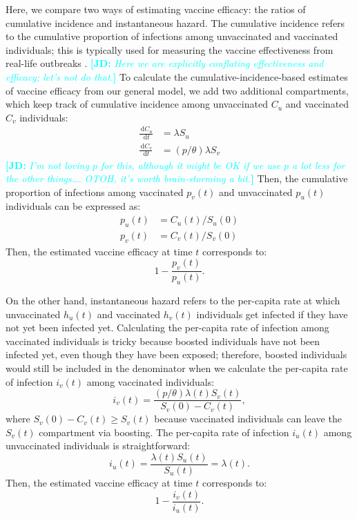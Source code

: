 \documentclass[12pt]{article}
\newcommand{\comment}{\showcomment}
\newcommand{\showcomment}[3]{\textcolor{#1}{\textbf{[#2: }\textsl{#3}\textbf{]}}}
\newcommand{\jd}[1]{\comment{cyan}{JD}{#1}}
\newcommand{\dd}[1]{\ensuremath{\, \mathrm{d}#1}}
\begin{document}
Here, we compare two ways of estimating vaccine efficacy: the ratios of cumulative incidence and instantaneous hazard.
The cumulative incidence refers to the cumulative proportion of infections among unvaccinated and vaccinated individuals; 
this is typically used for measuring the vaccine effectiveness from real-life outbreaks \citep{farrington1993estimation}.
\jd{Here we are explicitly conflating effectiveness and efficacy; let's not do that.}
To calculate the cumulative-incidence-based estimates of vaccine efficacy from our general model, we add two additional compartments, which keep track of cumulative incidence among unvaccinated $C_u$ and vaccinated $C_v$ individuals:
\begin{align}
\frac{\dd C_u}{\dd t} &= \lambda S_u\\
\frac{\dd C_v}{\dd t} &= (p/\theta) \lambda S_v
\end{align}
\jd{I'm not loving $p$ for this, although it might be OK if we use $p$ a lot less for the other things\ldots. OTOH, it's worth brain-storming a bit.}
Then, the cumulative proportion of infections among vaccinated $p_v(t)$ and unvaccinated $p_u(t)$ individuals can be expressed as:
\begin{align}
p_u(t) &= C_u(t)/S_u(0)\\
p_v(t) &= C_v(t)/S_v(0)
\end{align}
Then, the estimated vaccine efficacy at time $t$ corresponds to:
\begin{equation}
1 - \frac{p_v(t)}{p_u(t)}.
\end{equation}

On the other hand, instantaneous hazard refers to the per-capita rate at which unvaccinated $h_u(t)$ and vaccinated $h_v(t)$ individuals get infected if they have not yet been infected yet.
Calculating the per-capita rate of infection among vaccinated individuals is tricky because boosted individuals have not been infected yet, even though they have been exposed; therefore, boosted individuals would still be included in the denominator when we calculate the per-capita rate of infection $i_v(t)$ among vaccinated individuals:
\begin{equation}
i_v(t) = \frac{(p/\theta) \lambda(t) S_v(t)}{S_v(0) - C_v(t)},
\end{equation}
where $S_v(0) - C_v(t) \geq S_v(t)$ because vaccinated individuals can leave the $S_v(t)$ compartment via boosting.
The per-capita rate of infection $i_u(t)$ among unvaccinated individuals is straightforward: 
\begin{equation}
i_u(t) = \frac{\lambda(t) S_u(t)}{S_u(t)} = \lambda(t).
\end{equation}
Then, the estimated vaccine efficacy at time $t$ corresponds to:
\begin{equation}
1 - \frac{i_v(t)}{i_u(t)}.
\end{equation}
\end{document}
